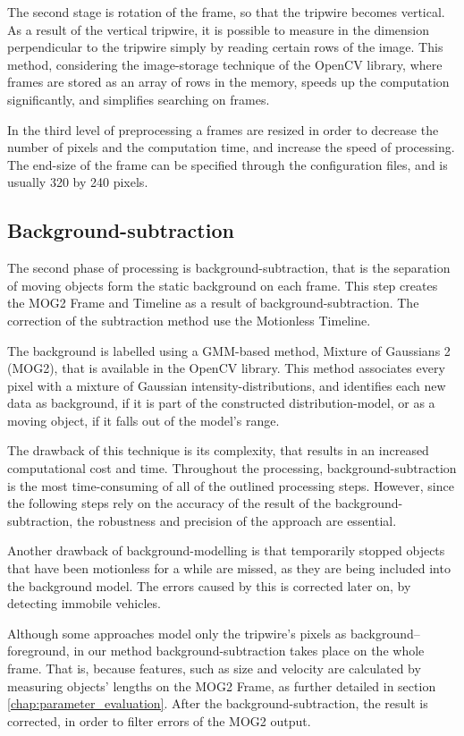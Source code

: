 The second stage is rotation of the frame, so that the tripwire becomes vertical.
As a result of the vertical tripwire, it is possible to measure in the dimension perpendicular to the tripwire simply by reading certain rows of the image.
This method, considering the image-storage technique of the OpenCV library, where frames are stored as an array of rows in the memory, speeds up the computation significantly, and simplifies searching on frames.

In the third level of preprocessing a frames are resized in order to decrease the number of pixels and the computation time, and increase the speed of processing.
The end-size of the frame can be specified through the configuration files, and is usually 320 by 240 pixels.
\subsection{Background-subtraction}
The second phase of processing is background-subtraction, that is the separation of moving objects form the static background on each frame.
This step creates the MOG2 Frame and Timeline as a result of background-subtraction.
The correction of the subtraction method use the Motionless Timeline.

The background is labelled using a GMM-based method, Mixture of Gaussians 2 (MOG2), that is available in the OpenCV library.
This method associates every pixel with a mixture of Gaussian intensity-distributions, and identifies each new data as background, if it is part of the constructed distribution-model, or as a moving object, if it falls out of the model's range.

The drawback of this technique is its complexity, that results in an increased computational cost and time.
Throughout the processing, background-subtraction is the most time-consuming of all of the outlined processing steps.
However, since the following steps rely on the accuracy of the result of the background-subtraction, the robustness and precision of the approach are essential.

Another drawback of background-modelling is that temporarily stopped objects that have been motionless for a while are missed, as they are being included into the background model.
The errors caused by this is corrected later on, by detecting immobile vehicles.

Although some approaches model only the tripwire's pixels as background--foreground, in our method background-subtraction takes place on the whole frame.
That is, because features, such as size and velocity are calculated by measuring objects' lengths on the MOG2 Frame, as further detailed in section \ref{chap:parameter_evaluation}.
After the background-subtraction, the result is corrected, in order to filter errors of the MOG2 output.

